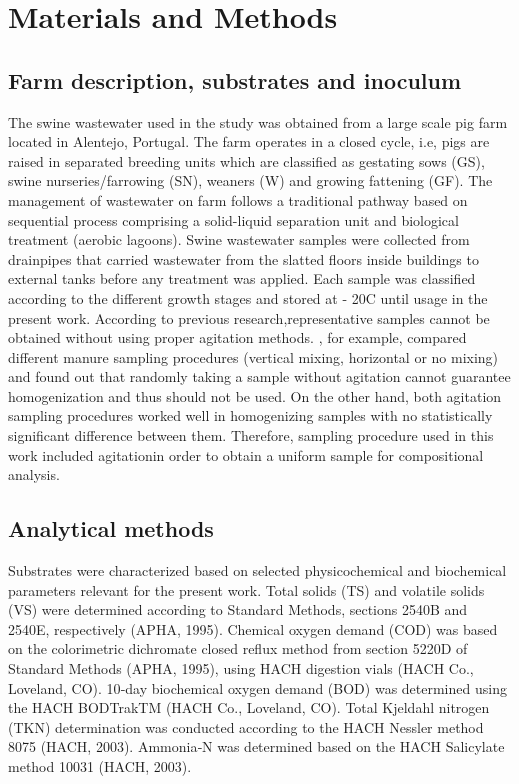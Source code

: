 \section{Materials and Methods}
\subsection{Farm description, substrates and inoculum}
The swine wastewater used in the study was obtained from a large scale pig farm located in Alentejo, Portugal. The farm operates in a closed cycle, i.e, pigs are raised in separated breeding units which are classified as gestating sows (GS), swine nurseries/farrowing (SN), weaners (W) and growing fattening (GF). The management of wastewater on farm follows a traditional pathway based on sequential process comprising a solid-liquid separation unit and biological treatment (aerobic lagoons). Swine wastewater samples were collected from drainpipes that carried wastewater from the slatted floors inside buildings to external tanks before any treatment was applied. Each sample was classified according to the different growth stages and stored at - 20\textdegree C until usage in the present work. According to previous research,representative samples cannot be obtained without using proper agitation methods. \cite{Zhu_2004}, for example, compared different manure sampling procedures (vertical mixing, horizontal or no mixing) and found out that randomly taking a sample without agitation cannot guarantee homogenization and thus should not be used. On the other hand, both agitation sampling procedures worked well in homogenizing samples with no statistically significant difference between them.  Therefore, sampling procedure used in this work included agitationin order to obtain a uniform sample for compositional analysis.
\subsection{Analytical methods}
Substrates were characterized based on selected physicochemical and biochemical parameters relevant for the present work. Total solids (TS) and volatile solids (VS) were determined according to Standard Methods, sections 2540B and 2540E, respectively (APHA, 1995). Chemical oxygen demand (COD) was based on the colorimetric dichromate closed reflux method from section 5220D of Standard Methods (APHA, 1995), using HACH digestion vials (HACH Co., Loveland, CO). 10‐day biochemical oxygen demand (BOD) was determined using the HACH BODTrakTM (HACH Co., Loveland, CO). Total Kjeldahl nitrogen (TKN) determination was conducted according to the HACH Nessler method 8075 (HACH, 2003). Ammonia‐N was determined based on the HACH Salicylate method 10031 (HACH, 2003). 
